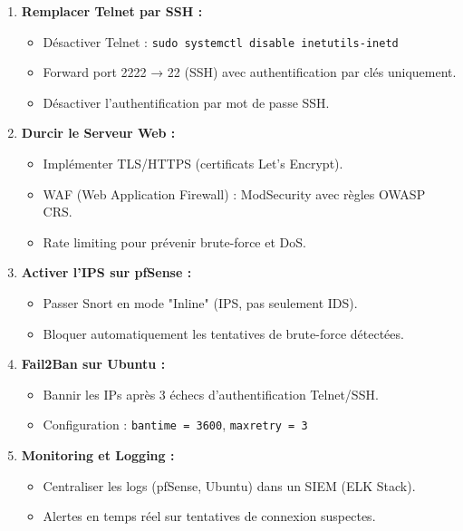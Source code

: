 \documentclass[12pt,a4paper,openany]{report}
\begin{document}
	\begin{enumerate}
		\item \textbf{Remplacer Telnet par SSH :}
		\begin{itemize}
			\item Désactiver Telnet : \texttt{sudo systemctl disable inetutils-inetd}
			\item Forward port 2222 → 22 (SSH) avec authentification par clés uniquement.
			\item Désactiver l'authentification par mot de passe SSH.
		\end{itemize}
		
		\item \textbf{Durcir le Serveur Web :}
		\begin{itemize}
			\item Implémenter TLS/HTTPS (certificats Let's Encrypt).
			\item WAF (Web Application Firewall) : ModSecurity avec règles OWASP CRS.
			\item Rate limiting pour prévenir brute-force et DoS.
		\end{itemize}
		
		\item \textbf{Activer l'IPS sur pfSense :}
		\begin{itemize}
			\item Passer Snort en mode "Inline" (IPS, pas seulement IDS).
			\item Bloquer automatiquement les tentatives de brute-force détectées.
		\end{itemize}
		
		\item \textbf{Fail2Ban sur Ubuntu :}
		\begin{itemize}
			\item Bannir les IPs après 3 échecs d'authentification Telnet/SSH.
			\item Configuration : \texttt{bantime = 3600}, \texttt{maxretry = 3}
		\end{itemize}
		
		\item \textbf{Monitoring et Logging :}
		\begin{itemize}
			\item Centraliser les logs (pfSense, Ubuntu) dans un SIEM (ELK Stack).
			\item Alertes en temps réel sur tentatives de connexion suspectes.
		\end{itemize}
	\end{enumerate}
	
\end{document}
